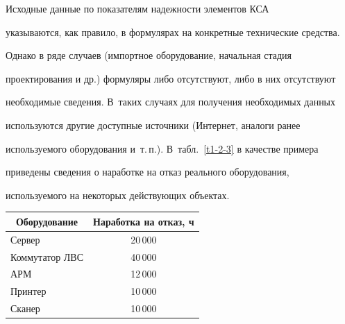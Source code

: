      Исходные данные по показателям надежности элементов КСА 


указываются, как правило, в формулярах на конкретные технические средства. 


Однако в ряде случаев (импортное оборудование, начальная стадия 


проектирования и др.) формуляры либо отсутствуют, либо в них отсутствуют 


необходимые сведения. В~таких случаях для получения необходимых данных 


используются другие доступные источники (Интернет, аналоги ранее 


используемого оборудования и~т.\,п.). В~табл.~\ref{t1-2-3} в качестве примера 


приведены сведения о наработке на отказ реального оборудования, 


используемого на некоторых действующих объектах.


     


     \begin{table}\small


     \begin{center}


\parbox{194pt}{


     


     }


     


     \vspace*{2ex}


     


     \begin{tabular}{|l|c|}


     \hline


     


\multicolumn{1}{|c|}{Оборудование}&Наработка на отказ, ч\\


\hline


Сервер &20\,000\\


Коммутатор ЛВС &40\,000\\


АРМ&12\,000\\


Принтер &10\,000\\


Сканер&10\,000\\


\hline


\end{tabular}


\end{center}


\end{table}





